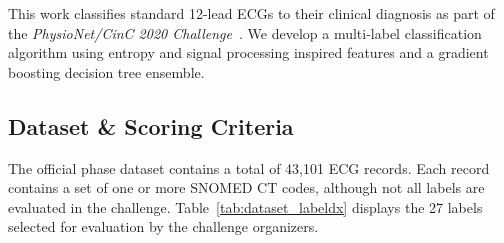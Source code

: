 \documentclass[twocolumn]{cinc}
\begin{document}
This work classifies standard 12-lead ECGs to their clinical diagnosis as part of the \emph{PhysioNet/CinC 2020 Challenge}~\cite{physionet_challenge_2020}.
We develop a multi-label classification algorithm using entropy and signal processing inspired features and a gradient boosting decision tree ensemble.

\subsection{Dataset \& Scoring Criteria}

The official phase dataset contains a total of 43,101 ECG records.
Each record contains a set of one or more SNOMED CT codes, although not all labels are evaluated in the challenge.
Table~\ref{tab:dataset_labeldx} displays the 27 labels selected for evaluation by the challenge organizers.
\end{document}
